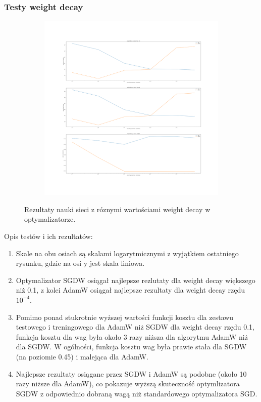 \documentclass[12pt]{article}
\begin{document}
\subsubsection{Testy weight decay}
\begin{figure}[H]
	\centering
	\begin{subfigure}[b]{1\linewidth}
		\includegraphics[width=\linewidth]{Comparision_weight_decay.png}
	\end{subfigure}
	\label{fig:decay}
	\caption{Rezultaty nauki sieci z róznymi wartościami weight decay w optymalizatorze.}
\end{figure}
Opis testów i ich rezultatów:
\begin{enumerate}
	\item Skale na obu osiach są skalami logarytmicznymi z wyjątkiem ostatniego rysunku, gdzie na osi y jest skala liniowa.
	\item Optymalizator SGDW osiągał najlepsze rezlutaty dla weight decay większego niż 0.1, z kolei AdamW osiągał najlepsze rezultaty dla weight decay rzędu \(10^{-4}\).
	\item Pomimo ponad stukrotnie wyższej wartości funkcji kosztu dla zestawu testowego i treningowego dla AdamW niż SGDW dla weight decay rzędu 0.1, funkcja kosztu dla wag była około 3 razy niższa dla algorytmu AdamW niż dla SGDW. W ogólności, funkcja kosztu wag była prawie stała dla SGDW (na poziomie 0.45) i malejąca dla AdamW.
	\item Najlepsze rezultaty osiągane przez SGDW i AdamW są podobne (około 10 razy niższe dla AdamW), co pokazuje wyższą skuteczność optymlizatora SGDW z odpowiednio dobraną wagą niż standardowego optymalizatora SGD.
\end{enumerate}
\end{document}
